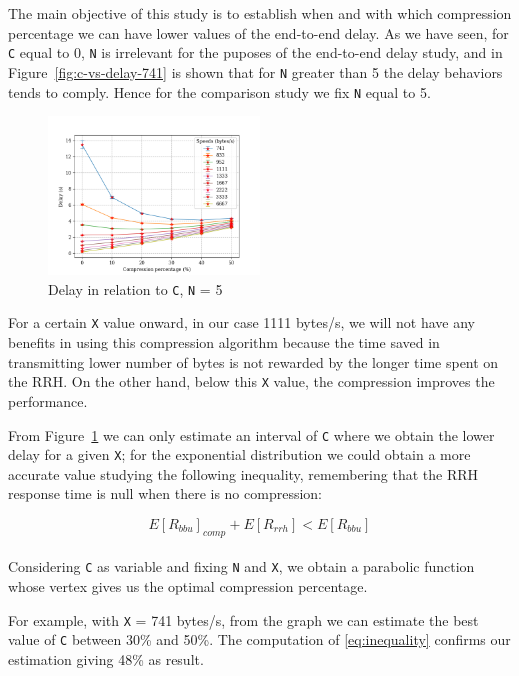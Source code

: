 \documentclass[11pt,a4paper,oneside, openright]{article}
\begin{document}
The main objective of this study is to establish when and with which compression percentage we can have lower values of the end-to-end delay. As we have seen, for \texttt{C} equal to 0, \texttt{N} is irrelevant for the puposes of the end-to-end delay study, and in Figure~\ref{fig:c-vs-delay-741} is shown that for \texttt{N} greater than 5 the delay behaviors tends to comply. Hence for the comparison study we fix \texttt{N} equal to 5. 

\begin{figure}[h]
	\centering
	\includegraphics[width=0.5\textwidth]{images/c-vs-delay-comparison}
	\caption{Delay in relation to \texttt{C}, \texttt{N} = 5} 
	\label{fig:c-vs-delay-comparison}
\end{figure}

For a certain \texttt{X} value onward, in our case 1111 bytes/s, we will not have any benefits in using this compression algorithm because the time saved in transmitting lower number of bytes is not rewarded by the longer time spent on the RRH.
On the other hand, below this \texttt{X} value, the compression improves the performance. 

From Figure~\ref{fig:c-vs-delay-comparison} we can only estimate an interval of \texttt{C} where we obtain the lower delay for a given \texttt{X}; for the exponential distribution we could obtain a more accurate value studying the following inequality, remembering that the RRH response time is null when there is no compression:

\begin{equation} \label{eq:inequality}
E[R_{bbu}]_{comp} + E[R_{rrh}] < E[R_{bbu}]
\end{equation}
\\
Considering \texttt{C} as variable and fixing \texttt{N} and \texttt{X}, we obtain a parabolic function whose vertex gives us the optimal compression percentage.

For example, with \texttt{X} = 741 bytes/s, from the graph we can estimate the best value of \texttt{C} between 30\% and 50\%. The computation of \ref{eq:inequality} confirms our estimation giving 48\% as result.
\end{document}
